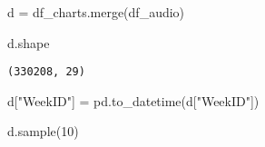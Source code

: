 \documentclass[
  a4paper,
]{scrbook}
\newenvironment{Shaded}{\begin{snugshade}}{\end{snugshade}}
\newcommand{\DecValTok}[1]{\textcolor[rgb]{0.68,0.00,0.00}{#1}}
\newcommand{\NormalTok}[1]{\textcolor[rgb]{0.00,0.23,0.31}{#1}}
\newcommand{\OperatorTok}[1]{\textcolor[rgb]{0.37,0.37,0.37}{#1}}
\newcommand{\StringTok}[1]{\textcolor[rgb]{0.13,0.47,0.30}{#1}}
\begin{document}
\begin{Shaded}
\begin{Highlighting}[]
\NormalTok{d }\OperatorTok{=}\NormalTok{ df\_charts.merge(df\_audio)}
\end{Highlighting}
\end{Shaded}

\begin{Shaded}
\begin{Highlighting}[]
\NormalTok{d.shape}
\end{Highlighting}
\end{Shaded}

\begin{verbatim}
(330208, 29)
\end{verbatim}

\begin{Shaded}
\begin{Highlighting}[]
\NormalTok{d[}\StringTok{"WeekID"}\NormalTok{] }\OperatorTok{=}\NormalTok{ pd.to\_datetime(d[}\StringTok{"WeekID"}\NormalTok{])}
\end{Highlighting}
\end{Shaded}

\begin{Shaded}
\begin{Highlighting}[]
\NormalTok{d.sample(}\DecValTok{10}\NormalTok{)}
\end{Highlighting}
\end{Shaded}
\end{document}
